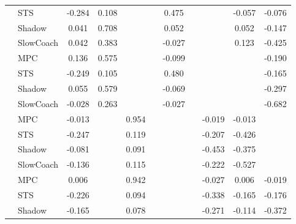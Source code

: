\begin{tabular}{|l|l|*{9}{c|}}
                                                           & STS &   -0.284 &     0.108 &        &     &  0.475 &     &      &  -0.057 &   -0.076 \\
                                                           & Shadow &    0.041 &     0.708 &        &     &  0.052 &     &      &   0.052 &   -0.147 \\
                                                           & SlowCoach &    0.042 &     0.383 &        &     & -0.027 &     &      &   0.123 &   -0.425 \\
\midrule
[True, True, False, False, True, False, False, False, True] & MPC &    0.136 &     0.575 &        &     & -0.099 &     &      &      &   -0.190 \\
                                                           & STS &   -0.249 &     0.105 &        &     &  0.480 &     &      &      &   -0.165 \\
                                                           & Shadow &    0.055 &     0.579 &        &     & -0.069 &     &      &      &   -0.297 \\
                                                           & SlowCoach &   -0.028 &     0.263 &        &     & -0.027 &     &      &      &   -0.682 \\
\midrule
[True, False, True, False, False, False, True, True, False] & MPC &   -0.013 &        &     0.954 &     &     &     &  -0.019 &  -0.013 &       \\
                                                           & STS &   -0.247 &        &     0.119 &     &     &     &  -0.207 &  -0.426 &       \\
                                                           & Shadow &   -0.081 &        &     0.091 &     &     &     &  -0.453 &  -0.375 &       \\
                                                           & SlowCoach &   -0.136 &        &     0.115 &     &     &     &  -0.222 &  -0.527 &       \\
\midrule
[True, False, True, False, False, False, True, True, True] & MPC &    0.006 &        &     0.942 &     &     &     &  -0.027 &   0.006 &   -0.019 \\
                                                           & STS &   -0.226 &        &     0.094 &     &     &     &  -0.338 &  -0.165 &   -0.176 \\
                                                           & Shadow &   -0.165 &        &     0.078 &     &     &     &  -0.271 &  -0.114 &   -0.372 \\

\end{tabular}
